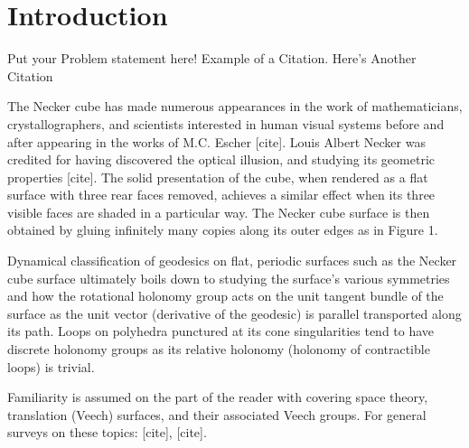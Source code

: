 \documentclass[]{article}
\begin{document}
\newpage
\section{Introduction}

Put your Problem statement here! Example of a Citation\cite[p.219]{Robotics}. Here's Another Citation \cite{Flueck}

The Necker cube has made numerous appearances in the work of mathematicians, crystallographers, and scientists interested in human visual systems before and after appearing in the works of M.C. Escher [cite]. Louis Albert Necker was credited for having discovered the optical illusion, and studying its geometric properties [cite]. The solid presentation of the cube, when rendered as a flat surface with three rear faces removed, achieves a similar effect when its three visible faces are shaded in a particular way. The Necker cube surface is then obtained by gluing infinitely many copies along its outer edges as in Figure 1.


Dynamical classification of geodesics on flat, periodic surfaces such as the Necker cube surface ultimately boils down to  studying the surface's various symmetries and how the rotational holonomy group acts on the unit tangent bundle of the surface as the unit vector (derivative of the geodesic) is parallel transported along its path. Loops on polyhedra punctured at its cone singularities tend to have discrete holonomy groups as its relative holonomy (holonomy of contractible loops) is trivial. 

\begin{rem}
Familiarity is assumed on the part of the reader with covering space theory, translation (Veech) surfaces, and their associated Veech groups. For general surveys on these topics: [cite], [cite].
\end{rem}
\end{document}
